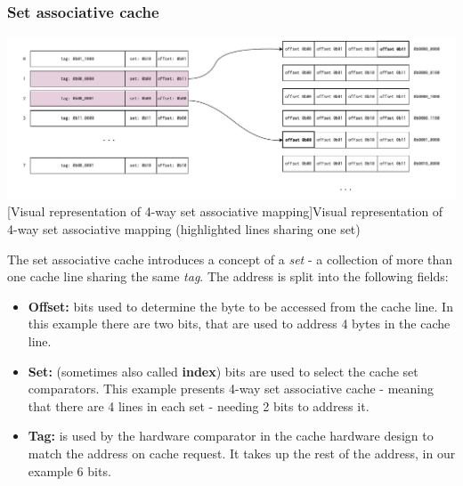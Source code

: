 \subsubsection{Set associative cache}
\begin{center}
	\centering
	\includegraphics[width=\textwidth]{figures/02-background/set_ass_mem.pdf}
	[Visual representation of 4-way set associative mapping]{Visual representation of 4-way set associative mapping (highlighted lines sharing one set)}
	\label{fig:set_ass_mem}
\end{center}

\noindent The set associative cache introduces a concept of a \textit{set} - a collection of more than one cache line sharing the same \textit{tag}. The address is split into the following fields:

\begin{itemize}
	\item \textbf{Offset:} bits used to determine the byte to be accessed from the cache line. In this example there are two bits, that are used to address 4 bytes in the cache line.
	\item \textbf{Set:} (sometimes also called \textbf{index}) bits are used to select the cache set comparators. This example presents 4-way set associative cache - meaning that there are 4 lines
		in each set - needing 2 bits to address it.
	\item \textbf{Tag:} is used by the hardware comparator in the cache hardware design to match the address on cache request. It takes up the rest of the address, in our example 6 bits.
\end{itemize}

